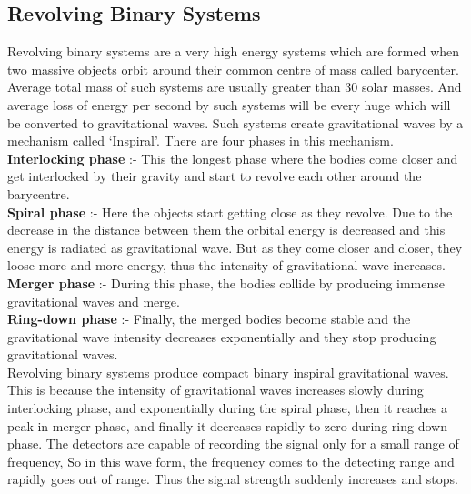 \subsection{Revolving Binary Systems}

Revolving binary systems are a very high energy systems which are formed when two massive objects orbit around their common centre of mass called barycenter. Average total mass of such systems are usually greater than 30 solar masses. And average loss of energy per second by such systems will be every huge which will be converted to gravitational waves. Such systems create gravitational waves by a mechanism called `Inspiral'. There are four phases in this mechanism. \\

\textbf{Interlocking phase} :- This the longest phase where the bodies come closer and get interlocked by their gravity and start to revolve each other around the barycentre. \\

\textbf{Spiral phase} :- Here the objects start getting close as they revolve. Due to the decrease in the distance between them the orbital energy is decreased and this energy is radiated as gravitational wave. But as they come closer and closer, they loose more and more energy, thus the intensity of gravitational wave increases.\\

\textbf{Merger phase} :- During this phase, the bodies collide by producing immense gravitational waves and merge. \\

\textbf{Ring-down phase} :- Finally, the merged bodies become stable and the gravitational wave intensity decreases exponentially and they stop producing gravitational waves. \\

Revolving binary systems produce compact binary inspiral gravitational waves. This is because the intensity of gravitational waves increases slowly during interlocking phase, and exponentially during the spiral phase, then it reaches a peak in merger phase, and finally it decreases rapidly to zero during ring-down phase. The detectors are capable of recording the signal only for a small range of frequency, So in this wave form, the frequency comes to the detecting range and rapidly goes out of range. Thus the signal strength suddenly increases and stops.

